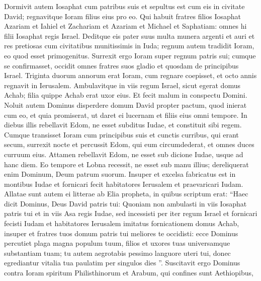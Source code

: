 \begin{biblechapter}
\begin{biblechapter}
\begin{biblechapter}
\begin{biblechapter}
\begin{biblechapter}
\begin{biblechapter}
\begin{biblechapter}
\begin{biblechapter}
\begin{biblechapter}
\begin{biblechapter}
\begin{biblechapter}
\begin{biblechapter}
\begin{biblechapter}
\begin{biblechapter}
\begin{biblechapter}
\begin{biblechapter}
\begin{biblechapter}
\begin{biblechapter}
\begin{biblechapter}
\begin{biblechapter}
\begin{biblechapter}
\verse Dormivit autem Iosaphat cum patribus suis et sepultus est cum eis in civitate David; regnavitque Ioram filius eius pro eo.
 \verse Qui habuit fratres filios Iosaphat Azariam et Iahiel et Zachariam et Azariam et Michael et Saphatiam: omnes hi filii Iosaphat regis Israel. 
\verse Deditque eis pater suus multa munera argenti et auri et res pretiosas cum civitatibus munitissimis in Iuda; regnum autem tradidit Ioram, eo quod esset primogenitus.
 \verse Surrexit ergo Ioram super regnum patris sui; cumque se confirmasset, occidit omnes fratres suos gladio et quosdam de principibus Israel.
 \verse Triginta duorum annorum erat Ioram, cum regnare coepisset, et octo annis regnavit in Ierusalem. 
\verse Ambulavitque in viis regum Israel, sicut egerat domus Achab; filia quippe Achab erat uxor eius. Et fecit malum in conspectu Domini. 
\verse Noluit autem Dominus disperdere domum David propter pactum, quod inierat cum eo, et quia promiserat, ut daret ei lucernam et filiis eius omni tempore.
 \verse In diebus illis rebellavit Edom, ne esset subditus Iudae, et constituit sibi regem. 
\verse Cumque transisset Ioram cum principibus suis et cunctis curribus, qui erant secum, surrexit nocte et percussit Edom, qui eum circumdederat, et omnes duces curruum eius. 
\verse Attamen rebellavit Edom, ne esset sub dicione Iudae, usque ad hanc diem. Eo tempore et Lobna recessit, ne esset sub manu illius; dereliquerat enim Dominum, Deum patrum suorum. 
\verse Insuper et excelsa fabricatus est in montibus Iudae et fornicari fecit habitatores Ierusalem et praevaricari Iudam.
 \verse Allatae sunt autem ei litterae ab Elia propheta, in quibus scriptum erat: “Haec dicit Dominus, Deus David patris tui: Quoniam non ambulasti in viis Iosaphat patris tui et in viis Asa regis Iudae, 
\verse sed incessisti per iter regum Israel et fornicari fecisti Iudam et habitatores Ierusalem imitatus fornicationem domus Achab, insuper et fratres tuos domum patris tui meliores te occidisti: 
\verse ecce Dominus percutiet plaga magna populum tuum, filios et uxores tuas universamque substantiam tuam; 
\verse tu autem aegrotabis pessimo languore uteri tui, donec egrediantur vitalia tua paulatim per singulos dies ”.
 \verse Suscitavit ergo Dominus contra Ioram spiritum Philisthinorum et Arabum, qui confines sunt Aethiopibus, 

\end{biblechapter}
\end{biblechapter}
\end{biblechapter}
\end{biblechapter}
\end{biblechapter}
\end{biblechapter}
\end{biblechapter}
\end{biblechapter}
\end{biblechapter}
\end{biblechapter}
\end{biblechapter}
\end{biblechapter}
\end{biblechapter}
\end{biblechapter}
\end{biblechapter}
\end{biblechapter}
\end{biblechapter}
\end{biblechapter}
\end{biblechapter}
\end{biblechapter}
\end{biblechapter}
